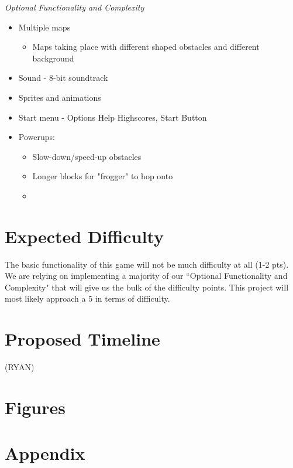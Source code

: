 \documentclass[journal, twocolumn, final,11pt,letterpaper]{IEEEtran}
\begin{document}
\vspace{5mm}

\textit{Optional Functionality and Complexity}
\begin{itemize}
	\item Multiple maps
	\begin{itemize}
		\item Maps taking place with different shaped obstacles and different background
	\end{itemize}
	\item Sound - 8-bit soundtrack
	\item Sprites and animations
	\item Start menu - Options Help Highscores, Start Button
	\item Powerups:
		\begin{itemize}
			\item Slow-down/speed-up obstacles
			\item Longer blocks for "frogger" to hop onto
			\item
		\end{itemize}
\end{itemize}

\section{Expected Difficulty}
The basic functionality of this game will not be much difficulty at all (1-2 pts). We are relying on implementing a majority of our ``Optional Functionality and Complexity" that will give us the bulk of the difficulty points. This project will most likely approach a 5 in terms of difficulty.

\section{Proposed Timeline} (RYAN)

\clearpage
\onecolumn
\section{Figures}



     

\section*{Appendix}
%
\end{document}
